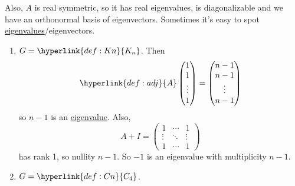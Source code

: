 \documentclass{article}
\begin{document}
Also, \hyperlink{def:adj}{$A$} is real symmetric, so it has real eigenvalues, is diagonalizable and we have an orthonormal basis of eigenvectors.
Sometimes it's easy to spot \hyperlink{def:eigen}{eigenvalues}/eigenvectors.
\begin{eg}\leavevmode
    \begin{enumerate}[label=\arabic*)]
        \item $G=\hyperlink{def:Kn}{K_n}$. Then
            \begin{equation*}
                \hyperlink{def:adj}{A}
                \begin{pmatrix}
                    1 \\ 1 \\ \vdots \\ 1
                \end{pmatrix} =
                \begin{pmatrix}
                    n-1 \\n-1 \\ \vdots \\ n-1
                \end{pmatrix}
            \end{equation*}
            so $n-1$ is an \hyperlink{def:eigen}{eigenvalue}. Also,
            \begin{equation*}
                A + I =
                \begin{pmatrix}
                    1 & \cdots & 1 \\
                    \vdots & \ddots & \vdots \\
                    1 & \cdots & 1
                \end{pmatrix}
            \end{equation*}
            has rank 1, so nullity $n-1$. So $-1$ is an eigenvalue with multiplicity $n-1$.
        \item $G=\hyperlink{def:Cn}{C_4}$.
            \begin{center}
            \end{center}

\end{enumerate}
\end{eg}
\end{document}
